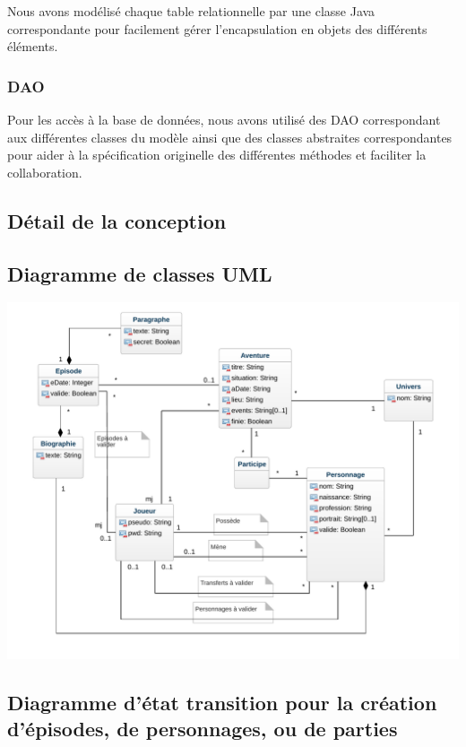 \documentclass[a4paper, 11pt, titlepage]{article}
\begin{document}
Nous avons modélisé chaque table relationnelle par une classe Java correspondante pour facilement gérer l'encapsulation en objets des différents éléments.


\subsubsection {DAO}

Pour les accès à la base de données, nous avons utilisé des DAO correspondant aux différentes classes du modèle ainsi que des classes abstraites correspondantes pour aider à la spécification originelle des différentes méthodes et faciliter la collaboration.



\subsection {Détail de la conception}

\subsection {Diagramme de classes UML}

\includegraphics[scale=0.7]{conception/classes}

\subsection {Diagramme d'état transition pour la création d'épisodes, de personnages, ou de parties}
\end{document}
